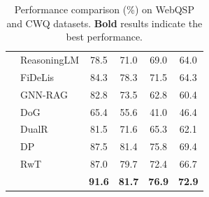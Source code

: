 \begin{table}[t]
{\begin{tabular}{clcccc}
& ReasoningLM & 78.5 & 71.0 & 69.0 & 64.0 \\
& FiDeLis & 84.3 & 78.3 & 71.5 & 64.3 \\
& GNN-RAG & 82.8 & 73.5 & 62.8 & 60.4 \\
& DoG & 65.4 & 55.6 & 41.0 & 46.4 \\
& DualR & 81.5 & 71.6 & 65.3 & 62.1 \\
& DP & {87.5} & {81.4} & {75.8} & {69.4} \\
& RwT & 87.0 & 79.7 & 72.4 & 66.7 \\
\midrule
& \method{} & \textbf{91.6} & \textbf{81.7} & \textbf{76.9} & \textbf{72.9} \\
\bottomrule
\end{tabular}
}
\caption{Performance comparison (\%) on WebQSP and CWQ datasets. \textbf{Bold} results indicate the best performance.}
\label{tab:main_results}

\end{table}








